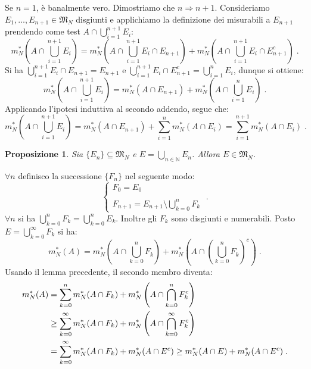 \documentclass[a4paper,12pt]{report}
\theoremstyle{plain}
\newtheorem{prop}{Proposizione}[section]
\theoremstyle{definition}
\theoremstyle{remark}
\numberwithin{equation}{section}
\begin{document}
Se $n=1$, è banalmente vero. Dimostriamo che $n \Longrightarrow n+1$. Consideriamo $E_1,\ldots,E_{n+1} \in \mathfrak{M}_N$ disgiunti e applichiamo la definizione dei misurabili a $E_{n+1}$ prendendo come test $A \cap \bigcup_{i=1}^{n+1} E_i$:
\begin{equation}
m_N^*\left(A\cap \bigcup_{i=1}^{n+1} E_i\right)=m_N^*\left(A\cap \bigcup_{i=1}^{n+1} E_i \cap E_{n+1}\right)+m_N^*\left(A\cap \bigcup_{i=1}^{n+1} E_i \cap E_{n+1}^c\right)\;.
\end{equation}
Si ha $\bigcup_{i=1}^{n+1} E_i \cap E_{n+1}=E_{n+1}$ e $\bigcup_{i=1}^{n+1} E_i \cap E_{n+1}^c=\bigcup_{i=1}^n E_i$, dunque si ottiene:
\begin{equation}
m_N^*\left(A\cap\bigcup_{i=1}^{n+1} E_i\right)= m_N^*(A\cap E_{n+1})+m_N^*\left(A\cap \bigcup_{i=1}^n E_i\right)\;.
\end{equation}
Applicando l'ipotesi induttiva al secondo addendo, segue che:
\begin{equation}
m_N^*\left(A\cap\bigcup_{i=1}^{n+1} E_i\right)=m_N^*(A\cap E_{n+1})+\sum_{i=1}^n m_N^*(A\cap E_i)=\sum_{i=1}^{n+1} m_N^*(A\cap E_i)\;.
\end{equation}
\endproof
\begin{prop} Sia $\{E_n\} \subseteq \mathfrak{M}_N$ e $E=\bigcup_{n \in \mathbb{N}} E_n$. Allora $E \in \mathfrak{M}_N$.
\end{prop}
\proof $\forall n$ definisco la successione $\{F_n\}$ nel seguente modo:
\begin{equation}
\begin{cases}
 F_0=E_0 \\
 \\
F_{n+1}=E_{n+1}\setminus \bigcup_{k=0}^n F_k
\end{cases}\;.
\end{equation}
$\forall n$ si ha $\bigcup_{k=0}^n F_k=\bigcup_{k=0}^n E_k$. Inoltre gli $F_k$ sono disgiunti e numerabili. Posto $E=\bigcup_{k=0}^{\infty
} F_k$ si ha:
\begin{equation}
m_N^*(A)=m_N^*\left(A\cap \bigcup_{k=0}^n F_k\right)+m_N^*\left(A\cap \left(\bigcup_{k=0}^n F_k\right)^{c}\right)\;.
\end{equation}
Usando il lemma precedente, il secondo membro diventa:
\begin{align}
m_N^*(A) &= \sum_{k=0}^n m_N^*(A\cap F_k)+m_N^*\left(A\cap\bigcap_{k=0}^n F_k^c\right) \notag \\
&\ge \sum_{k=0}^{\infty} m_N^*(A\cap F_k)+m_N^*\left(A\cap\bigcap_{k=0}^{\infty}F_k^c\right) \notag \\
&=\sum_{k=0}^{\infty} m_N^*(A\cap F_k)+m_N^*(A\cap E^c)\ge m_N^*(A\cap E)+m_N^*(A\cap E^c)\;.
\end{align}
\end{document}
